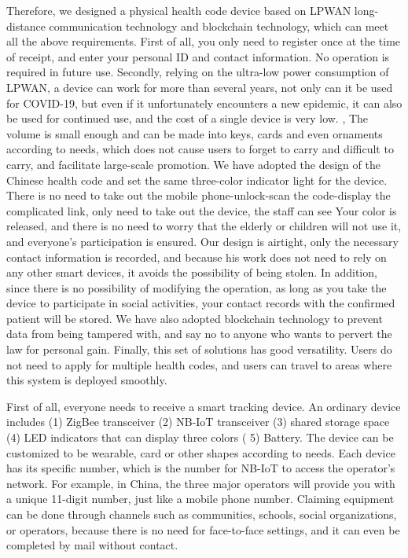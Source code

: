 \documentclass[conference]{IEEEtran}
\begin{document}
\par Therefore, we designed a physical health code device based on LPWAN long-distance communication technology and blockchain technology, which can meet all the above requirements. First of all, you only need to register once at the time of receipt, and enter your personal ID and contact information. No operation is required in future use. Secondly, relying on the ultra-low power consumption of LPWAN, a device can work for more than several years, not only can it be used for COVID-19, but even if it unfortunately encounters a new epidemic, it can also be used for continued use, and the cost of a single device is very low. , The volume is small enough and can be made into keys, cards and even ornaments according to needs, which does not cause users to forget to carry and difficult to carry, and facilitate large-scale promotion. We have adopted the design of the Chinese health code and set the same three-color indicator light for the device. There is no need to take out the mobile phone-unlock-scan the code-display the complicated link, only need to take out the device, the staff can see Your color is released, and there is no need to worry that the elderly or children will not use it, and everyone's participation is ensured. Our design is airtight, only the necessary contact information is recorded, and because his work does not need to rely on any other smart devices, it avoids the possibility of being stolen. In addition, since there is no possibility of modifying the operation, as long as you take the device to participate in social activities, your contact records with the confirmed patient will be stored. We have also adopted blockchain technology to prevent data from being tampered with, and say no to anyone who wants to pervert the law for personal gain. Finally, this set of solutions has good versatility. Users do not need to apply for multiple health codes, and users can travel to areas where this system is deployed smoothly.
\par First of all, everyone needs to receive a smart tracking device. An ordinary device includes (1) ZigBee transceiver (2) NB-IoT transceiver (3) shared storage space (4) LED indicators that can display three colors ( 5) Battery. The device can be customized to be wearable, card or other shapes according to needs. Each device has its specific number, which is the number for NB-IoT to access the operator's network. For example, in China, the three major operators will provide you with a unique 11-digit number, just like a mobile phone number. Claiming equipment can be done through channels such as communities, schools, social organizations, or operators, because there is no need for face-to-face settings, and it can even be completed by mail without contact.
\end{document}
